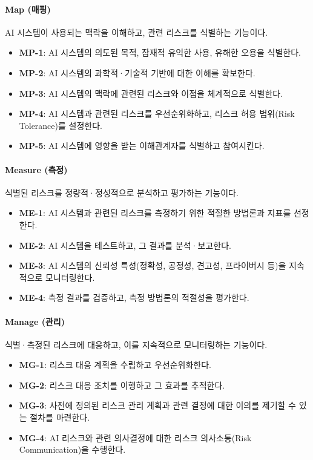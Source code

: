\paragraph{Map (매핑)}
AI 시스템이 사용되는 맥락을 이해하고, 관련 리스크를 식별하는 기능이다.

\begin{itemize}
 \item \textbf{MP-1}: AI 시스템의 의도된 목적, 잠재적 유익한 사용, 유해한 오용을 식별한다.
 \item \textbf{MP-2}: AI 시스템의 과학적·기술적 기반에 대한 이해를 확보한다.
 \item \textbf{MP-3}: AI 시스템의 맥락에 관련된 리스크와 이점을 체계적으로 식별한다.
 \item \textbf{MP-4}: AI 시스템과 관련된 리스크를 우선순위화하고, 리스크 허용 범위(Risk Tolerance)를 설정한다.
 \item \textbf{MP-5}: AI 시스템에 영향을 받는 이해관계자를 식별하고 참여시킨다.
\end{itemize}

\paragraph{Measure (측정)}
식별된 리스크를 정량적·정성적으로 분석하고 평가하는 기능이다.

\begin{itemize}
 \item \textbf{ME-1}: AI 시스템과 관련된 리스크를 측정하기 위한 적절한 방법론과 지표를 선정한다.
 \item \textbf{ME-2}: AI 시스템을 테스트하고, 그 결과를 분석·보고한다.
 \item \textbf{ME-3}: AI 시스템의 신뢰성 특성(정확성, 공정성, 견고성, 프라이버시 등)을 지속적으로 모니터링한다.
 \item \textbf{ME-4}: 측정 결과를 검증하고, 측정 방법론의 적절성을 평가한다.
\end{itemize}

\paragraph{Manage (관리)}
식별·측정된 리스크에 대응하고, 이를 지속적으로 모니터링하는 기능이다.

\begin{itemize}
 \item \textbf{MG-1}: 리스크 대응 계획을 수립하고 우선순위화한다.
 \item \textbf{MG-2}: 리스크 대응 조치를 이행하고 그 효과를 추적한다.
 \item \textbf{MG-3}: 사전에 정의된 리스크 관리 계획과 관련 결정에 대한 이의를 제기할 수 있는 절차를 마련한다.
 \item \textbf{MG-4}: AI 리스크와 관련 의사결정에 대한 리스크 의사소통(Risk Communication)을 수행한다.
\end{itemize}

